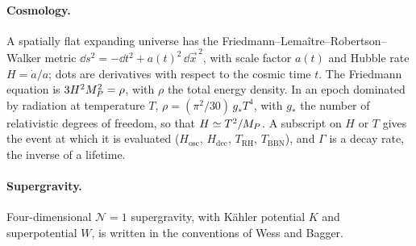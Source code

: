 \paragraph{Cosmology.} A spatially flat expanding universe has the Friedmann--Lemaître--Robertson--Walker metric $\dd s^2 = -\dd t^2 + a(t)^2\,\dd\vec x^{\,2}$, with scale factor $a(t)$ and Hubble rate $H = \dot a/a$; dots are derivatives with respect to the cosmic time $t$. The Friedmann equation is $3H^2M_{P}^2 = \rho$, with $\rho$ the total energy density. In an epoch dominated by radiation at temperature $T$, $\rho = (\pi^2/30)\,g_*T^4$, with $g_*$ the number of relativistic degrees of freedom, so that $H\simeq T^2/M_{P}$. A subscript on $H$ or $T$ gives the event at which it is evaluated ($H_{\text{osc}}$, $H_{\text{dec}}$, $T_{\text{RH}}$, $T_{\text{BBN}}$), and $\Gamma$ is a decay rate, the inverse of a lifetime.

\paragraph{Supergravity.} Four-dimensional $\mathcal N=1$ supergravity, with Kähler potential $K$ and superpotential $W$, is written in the conventions of Wess and Bagger.
